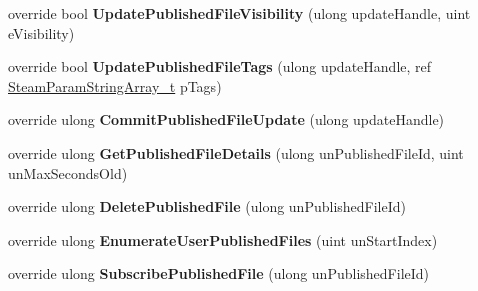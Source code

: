 \begin{DoxyCompactItemize}
\item 
\hypertarget{classValve_1_1Steamworks_1_1CSteamRemoteStorage_acc6f86cfd55cbc99c4eeb23246d2c466}{}override bool {\bfseries Update\+Published\+File\+Visibility} (ulong update\+Handle, uint e\+Visibility)\label{classValve_1_1Steamworks_1_1CSteamRemoteStorage_acc6f86cfd55cbc99c4eeb23246d2c466}

\item 
\hypertarget{classValve_1_1Steamworks_1_1CSteamRemoteStorage_aa9157042fd00695b6095d12b902e6f18}{}override bool {\bfseries Update\+Published\+File\+Tags} (ulong update\+Handle, ref \hyperlink{structValve_1_1Steamworks_1_1SteamParamStringArray__t}{Steam\+Param\+String\+Array\+\_\+t} p\+Tags)\label{classValve_1_1Steamworks_1_1CSteamRemoteStorage_aa9157042fd00695b6095d12b902e6f18}

\item 
\hypertarget{classValve_1_1Steamworks_1_1CSteamRemoteStorage_ab5243ca4584e28ce6eaf3a998eecbe35}{}override ulong {\bfseries Commit\+Published\+File\+Update} (ulong update\+Handle)\label{classValve_1_1Steamworks_1_1CSteamRemoteStorage_ab5243ca4584e28ce6eaf3a998eecbe35}

\item 
\hypertarget{classValve_1_1Steamworks_1_1CSteamRemoteStorage_af6adc7b88a5c8e6241ef40962466c245}{}override ulong {\bfseries Get\+Published\+File\+Details} (ulong un\+Published\+File\+Id, uint un\+Max\+Seconds\+Old)\label{classValve_1_1Steamworks_1_1CSteamRemoteStorage_af6adc7b88a5c8e6241ef40962466c245}

\item 
\hypertarget{classValve_1_1Steamworks_1_1CSteamRemoteStorage_a31d957600d98a97d22d1c3d3092f2782}{}override ulong {\bfseries Delete\+Published\+File} (ulong un\+Published\+File\+Id)\label{classValve_1_1Steamworks_1_1CSteamRemoteStorage_a31d957600d98a97d22d1c3d3092f2782}

\item 
\hypertarget{classValve_1_1Steamworks_1_1CSteamRemoteStorage_a71fc0ef784a6305434b98258cd71746e}{}override ulong {\bfseries Enumerate\+User\+Published\+Files} (uint un\+Start\+Index)\label{classValve_1_1Steamworks_1_1CSteamRemoteStorage_a71fc0ef784a6305434b98258cd71746e}

\item 
\hypertarget{classValve_1_1Steamworks_1_1CSteamRemoteStorage_aeac3d0d8794722f361f5dc5b57f4dade}{}override ulong {\bfseries Subscribe\+Published\+File} (ulong un\+Published\+File\+Id)\label{classValve_1_1Steamworks_1_1CSteamRemoteStorage_aeac3d0d8794722f361f5dc5b57f4dade}


\end{DoxyCompactItemize}
